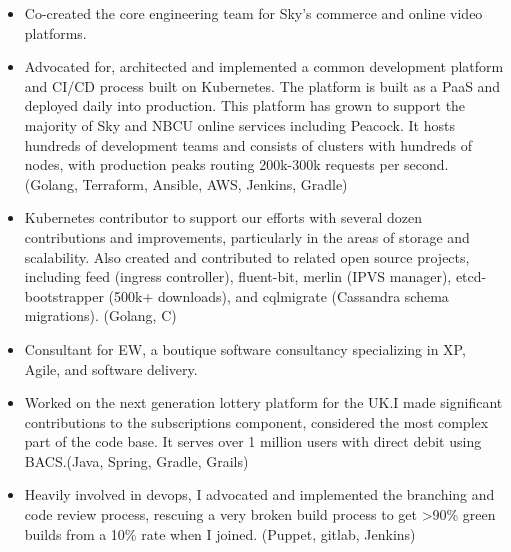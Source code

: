 \documentclass[11pt,a4paper,roman]{moderncv}
\begin{document}
\vspace{5mm}

\begin{itemize}
  \item Co-created the core engineering team for Sky's commerce and online video platforms.
  \item Advocated for, architected and implemented a common development platform and CI/CD process built on
        Kubernetes. The platform is built as a PaaS and deployed daily into production. This platform has
        grown to support the majority of Sky and NBCU online services including Peacock. It hosts hundreds
        of development teams and consists of clusters with hundreds of nodes, with production peaks routing
        200k-300k requests per second. (Golang, Terraform, Ansible, AWS, Jenkins, Gradle)
  \item Kubernetes contributor to support our efforts with several dozen contributions and improvements,
        particularly in the areas of storage and scalability. Also created and contributed to related
        open source projects, including feed (ingress controller), fluent-bit, merlin (IPVS manager),
        etcd-bootstrapper (500k+ downloads), and cqlmigrate (Cassandra schema migrations). (Golang, C)
\end{itemize}

\vspace{5mm}

\begin{itemize}
\item Consultant for EW, a boutique software consultancy specializing in XP, Agile, and software delivery.
\end{itemize}

\vspace{5mm}

\begin{itemize}
  \item Worked on the next generation lottery platform for the UK.\@ I made significant contributions
        to the subscriptions component, considered the most complex part of the code base. It serves
        over 1 million users with direct debit using BACS.\@ (Java, Spring, Gradle, Grails)
  \item Heavily involved in devops, I advocated and implemented the branching and code review process,
        rescuing a very broken build process to get >90\% green builds from a 10\% rate when I joined.
        (Puppet, gitlab, Jenkins)
\end{itemize}
\end{document}
